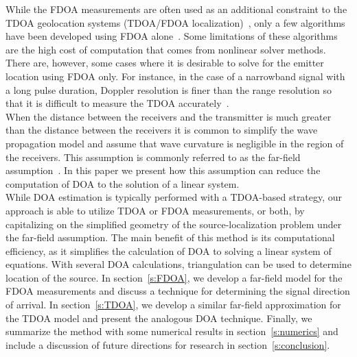 While the FDOA measurements are often used as an additional constraint to the TDOA geolocation systems (TDOA/FDOA localization)~\cite{Ho1997}, only a few algorithms have been developed using FDOA alone~\cite{Cameron,Jinzhou2012}. Some limitations of these algorithms are the high cost of computation that comes from nonlinear solver methods. There are, however, some cases where it is desirable to solve for the emitter location using FDOA only. For instance, in the case of a narrowband signal with a long pulse duration, Doppler resolution is finer than the range resolution so that it is difficult to measure the TDOA accurately~\cite{Cheney2009,Mason2005,Jinzhou2012}. \\

When the distance between the receivers and the transmitter is much greater than the distance between the receivers it is common to simplify the wave propagation model and assume that wave curvature is negligible in the region of the receivers. This assumption is commonly referred to as the far-field assumption~\cite{Cheney2009}. In this paper we present how this assumption can reduce the computation of DOA to the solution of a linear system. \\

While DOA estimation is typically performed with a TDOA-based strategy, our approach is able to utilize TDOA or FDOA measurements, or both, by capitalizing on the simplified geometry of the source-localization problem under the far-field assumption. The main benefit of this method is its computational efficiency, as it simplifies the calculation of DOA to solving a linear system of equations.  With several DOA calculations, triangulation can be used to determine location of the source. In section~\ref{s:FDOA}, we develop a far-field model for the FDOA measurements and discuss a technique for determining the signal direction of arrival. In section~\ref{s:TDOA}, we develop a similar far-field approximation for the TDOA model and present the analogous DOA technique. Finally, we summarize the method with some numerical results in section~\ref{s:numerics} and include a discussion of future directions for research in section~\ref{s:conclusion}.
